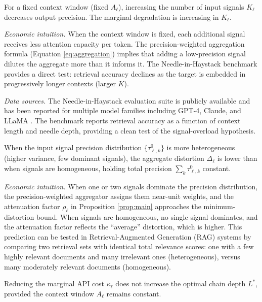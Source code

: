 \begin{prediction}\label{pred:signal_overload}
For a fixed context window (fixed $A_\ell$), increasing the number of input signals $K_\ell$ decreases output precision. The marginal degradation is increasing in $K_\ell$.
\end{prediction}

\textit{Economic intuition.} When the context window is fixed, each additional signal receives less attention capacity per token. The precision-weighted aggregation formula (Equation \ref{eq:aggregation}) implies that adding a low-precision signal dilutes the aggregate more than it informs it. The Needle-in-Haystack benchmark \citep{kamradt2023needle} provides a direct test: retrieval accuracy declines as the target is embedded in progressively longer contexts (larger $K$).

\textit{Data sources.} The Needle-in-Haystack evaluation suite is publicly available and has been reported for multiple model families including GPT-4, Claude, and LLaMA \citep{anthropic2024context,google2024gemini}. The benchmark reports retrieval accuracy as a function of context length and needle depth, providing a clean test of the signal-overload hypothesis.

\begin{prediction}\label{pred:heterogeneity}
When the input signal precision distribution $\{\tau^0_{\ell,k}\}$ is more heterogeneous (higher variance, few dominant signals), the aggregate distortion $\Delta_\ell$ is lower than when signals are homogeneous, holding total precision $\sum_k \tau^0_{\ell,k}$ constant.
\end{prediction}

\textit{Economic intuition.} When one or two signals dominate the precision distribution, the precision-weighted aggregator assigns them near-unit weights, and the attenuation factor $\rho_\ell$ in Proposition \ref{prop:main} approaches the minimum-distortion bound. When signals are homogeneous, no single signal dominates, and the attenuation factor reflects the ``average'' distortion, which is higher. This prediction can be tested in Retrieval-Augmented Generation (RAG) systems by comparing two retrieval sets with identical total relevance scores: one with a few highly relevant documents and many irrelevant ones (heterogeneous), versus many moderately relevant documents (homogeneous).

\begin{prediction}\label{pred:cost_irrelevance}
Reducing the marginal API cost $\kappa_\ell$ does not increase the optimal chain depth $L^*$, provided the context window $A_\ell$ remains constant.
\end{prediction}

